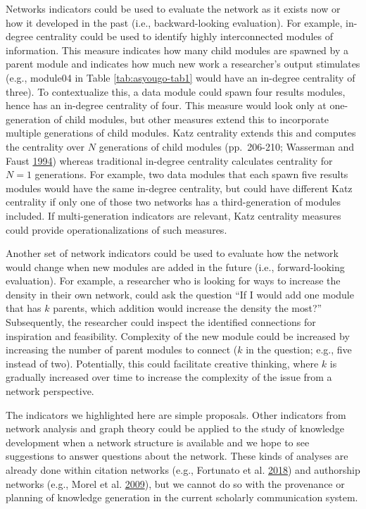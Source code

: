 \documentclass[a5paper]{book}
\begin{document}
Networks indicators could be used to evaluate the network as it exists
now or how it developed in the past (i.e., backward-looking evaluation).
For example, in-degree centrality could be used to identify highly
interconnected modules of information. This measure indicates how many
child modules are spawned by a parent module and indicates how much new
work a researcher's output stimulates (e.g., module04 in Table
\ref{tab:asyougo-tab1} would have an in-degree centrality of three). To
contextualize this, a data module could spawn four results modules,
hence has an in-degree centrality of four. This measure would look only
at one-generation of child modules, but other measures extend this to
incorporate multiple generations of child modules. Katz centrality
extends this and computes the centrality over \(N\) generations of child
modules (pp.~206-210; Wasserman and Faust
\protect\hyperlink{ref-isbn:9780521387071}{1994}) whereas traditional
in-degree centrality calculates centrality for \(N=1\) generations. For
example, two data modules that each spawn five results modules would
have the same in-degree centrality, but could have different Katz
centrality if only one of those two networks has a third-generation of
modules included. If multi-generation indicators are relevant, Katz
centrality measures could provide operationalizations of such measures.

Another set of network indicators could be used to evaluate how the
network would change when new modules are added in the future (i.e.,
forward-looking evaluation). For example, a researcher who is looking
for ways to increase the density in their own network, could ask the
question \enquote{If I would add one module that has \(k\) parents,
which addition would increase the density the most?} Subsequently, the
researcher could inspect the identified connections for inspiration and
feasibility. Complexity of the new module could be increased by
increasing the number of parent modules to connect (\(k\) in the
question; e.g., five instead of two). Potentially, this could facilitate
creative thinking, where \(k\) is gradually increased over time to
increase the complexity of the issue from a network perspective.

The indicators we highlighted here are simple proposals. Other
indicators from network analysis and graph theory could be applied to
the study of knowledge development when a network structure is available
and we hope to see suggestions to answer questions about the network.
These kinds of analyses are already done within citation networks (e.g.,
Fortunato et al.
\protect\hyperlink{ref-doi:10.1126ux2fscience.aao0185}{2018}) and
authorship networks (e.g., Morel et al.
\protect\hyperlink{ref-doi:10.1371ux2fjournal.pntd.0000501}{2009}), but
we cannot do so with the provenance or planning of knowledge generation
in the current scholarly communication system.
\end{document}
